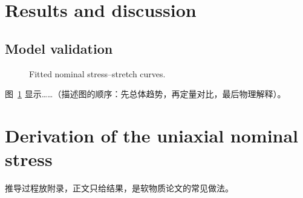 \documentclass[11pt,a4paper]{article}
\begin{document}
\section{Results and discussion}
\subsection{Model validation}
\begin{figure}[t]
  \centering
  \caption{Fitted nominal stress--stretch curves.}
  \label{fig:uniaxial}
\end{figure}
图~\ref{fig:uniaxial} 显示……（描述图的顺序：先总体趋势，再定量对比，最后物理解释）。

\appendix
\section{Derivation of the uniaxial nominal stress}
推导过程放附录，正文只给结果，是软物质论文的常见做法。



\end{document}
